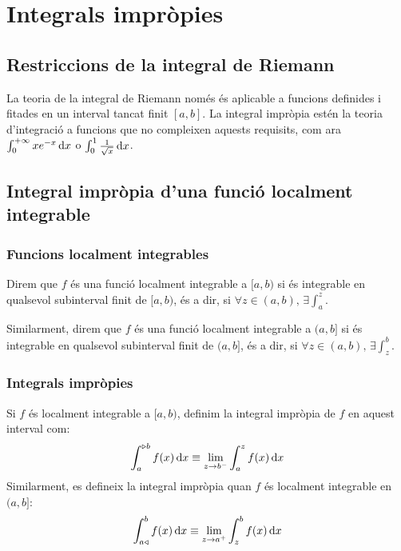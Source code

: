 \section{Integrals impròpies}
\subsection{Restriccions de la integral de Riemann}
La teoria de la integral de Riemann només és aplicable a funcions definides i fitades en un interval tancat finit $[a, b]$. La integral impròpia estén la teoria d'integració a funcions que no compleixen aquests requisits, com ara $\int_{0}^{+\infty} xe^{-x} \mathop{}\!\mathrm{d} x$ o $\int_{0}^{1} \frac{1}{\sqrt{x}} \mathop{}\!\mathrm{d} x$.

\subsection{Integral impròpia d'una funció localment integrable}
\subsubsection*{Funcions localment integrables}
Direm que $f$ és una funció localment integrable a $[a, b)$ si és integrable en qualsevol subinterval finit de $[a, b)$, és a dir, si $\forall z \in (a,b), \, \exists \int_{a}^{z}$.

Similarment, direm que $f$ és una funció localment integrable a $(a, b]$ si és integrable en qualsevol subinterval finit de $(a, b]$, és a dir, si $\forall z \in (a,b), \, \exists \int_{z}^{b}$.

\subsubsection*{Integrals impròpies}
Si $f$ és localment integrable a $[a, b)$, definim la integral impròpia de $f$ en aquest interval com:
\begin{align}
    \int_{a}^{\triangleright b} f(x) \mathop{}\!\mathrm{d} x \equiv \lim_{z \to b^{-}} \int_{a}^{z} f(x) \mathop{}\!\mathrm{d} x
\end{align}
Similarment, es defineix la integral impròpia quan $f$ és localment integrable en $(a, b]$:
\begin{align}
    \int_{a \triangleleft}^{b} f(x) \mathop{}\!\mathrm{d} x \equiv \lim_{z \to a^{+}} \int_{z}^{b} f(x) \mathop{}\!\mathrm{d} x
\end{align}

